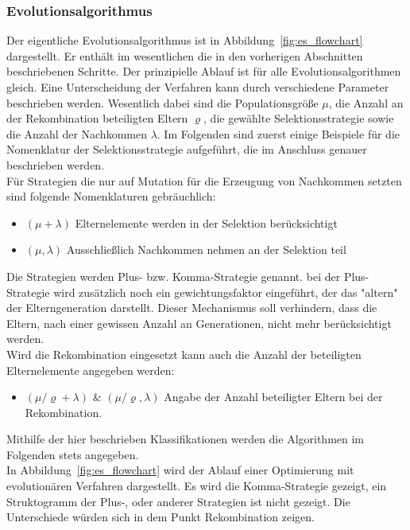 \subsubsection{Evolutionsalgorithmus}
%
Der eigentliche Evolutionsalgorithmus ist in Abbildung~\ref{fig:es_flowchart} dargestellt. Er enthält im wesentlichen die in den vorherigen Abschnitten beschriebenen Schritte. Der prinzipielle Ablauf ist für alle Evolutionsalgorithmen gleich. Eine Unterscheidung der Verfahren kann durch verschiedene Parameter beschrieben werden. Wesentlich dabei sind die Populationsgröße $\mu$, die Anzahl an der Rekombination beteiligten Eltern $\varrho$, die gewählte Selektionsstrategie sowie die Anzahl der Nachkommen $\lambda$. Im Folgenden sind zuerst einige Beispiele für die Nomenklatur der Selektionsstrategie aufgeführt, die im Anschluss genauer beschrieben werden.\\
Für Strategien die nur auf Mutation für die Erzeugung von Nachkommen setzten sind folgende Nomenklaturen gebräuchlich:
\begin{itemize}
\item $(\mu+\lambda)$ Elternelemente werden in der Selektion berücksichtigt
\item $(\mu,\lambda)$ Ausschließlich Nachkommen nehmen an der Selektion teil
\end{itemize}
%
Die Strategien werden Plus- bzw. Komma-Strategie genannt. bei der Plus-Strategie wird zusätzlich noch ein gewichtungsfaktor eingeführt, der das "altern" der Elterngeneration darstellt. Dieser Mechanismus soll verhindern, dass die Eltern, nach einer gewissen Anzahl an Generationen, nicht mehr berücksichtigt werden.\\
Wird die Rekombination eingesetzt kann auch die Anzahl der beteiligten Elternelemente angegeben werden:
\begin{itemize}
\item $({\mu}/{\varrho}+\lambda)$ \& $({\mu}/{\varrho},\lambda)$ Angabe der Anzahl beteiligter Eltern bei der Rekombination.
\end{itemize}
%
Mithilfe der hier beschrieben Klassifikationen werden die Algorithmen im Folgenden stets angegeben.\\

In Abbildung~\ref{fig:es_flowchart} wird der Ablauf einer Optimierung mit evolutionären Verfahren dargestellt. Es wird die Komma-Strategie gezeigt, ein Struktogramm der Plus-, oder anderer Strategien ist nicht gezeigt. Die Unterschiede würden sich in dem Punkt Rekombination zeigen.
%
